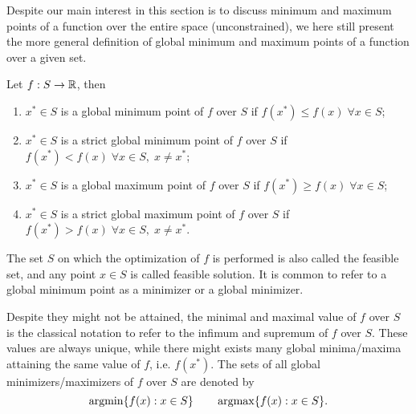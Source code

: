 \documentclass[10pt,a4paper]{article}
\begin{document}
Despite our main interest in this section is to discuss minimum and maximum points of a function over the entire space (unconstrained), we here still present the more general definition of global minimum and maximum points of a function over a given set. 
\begin{definition} 
	Let $f:S\to \mathbb{R}$, then
	\begin{enumerate}
		\item $x^* \in S$ is a global minimum point of $f$ over $S$ if $f(x^*)\leq f(x) \;\forall x \in S$;
		\item $x^* \in S$ is a strict global minimum point of $f$ over $S$ if $f(x^*)< f(x) \;\forall x \in S,\; x\neq x^*$;
		\item $x^* \in S$ is a global maximum point of $f$ over $S$ if $f(x^*)\geq f(x) \;\forall x \in S$;
		\item $x^* \in S$ is a strict global maximum point of $f$ over $S$ if $f(x^*)> f(x) \;\forall x \in S,\; x\neq x^*$.
	\end{enumerate}
\end{definition}
The set $S$ on which the optimization of $f$ is performed is also called the feasible set, and any point $x \in S$ is called feasible solution. It is common to refer to a global minimum point as a minimizer or a global minimizer.
\par Despite they might not be attained, the minimal and maximal value of $f$ over $S$ is the classical notation to refer to the infimum and supremum of $f$ over $S$. These values are always unique, while there might exists many global minima/maxima attaining the same value of $f$, i.e. $f(x^*)$. The sets of all global minimizers/maximizers of $f$ over $S$ are denoted by
\begin{equation*}
	\operatorname*{argmin} \{f(x): x\in S\}\qquad \operatorname*{argmax} \{f(x): x\in S\}.
\end{equation*}


















\end{document}
